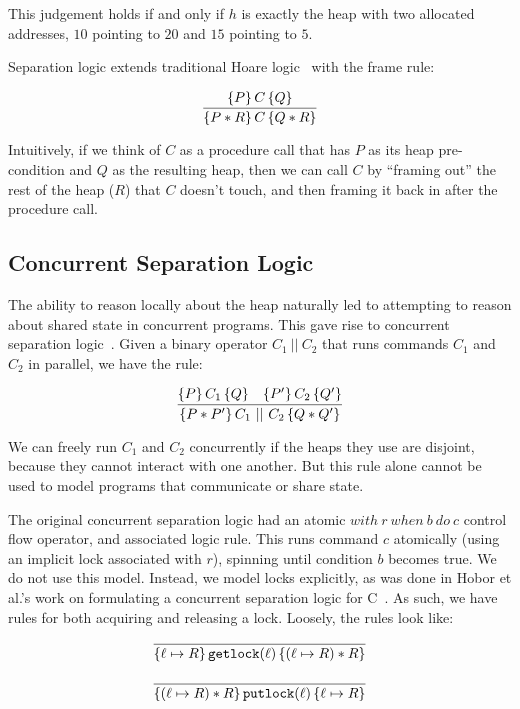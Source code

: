 This judgement holds if and only if $h$ is exactly the heap with two allocated
addresses, $10$ pointing to $20$ and $15$ pointing to $5$.

Separation logic extends traditional Hoare logic~\cite{hoare1969axiomatic} with
the frame rule:

\[
\infer{\hoaretrip{P * R}{C}{Q * R}}{\hoaretrip{P}{C}{Q}}
\]

Intuitively, if we think of $C$ as a procedure call that has $P$ as its heap
pre-condition and $Q$ as the resulting heap, then we can call $C$ by ``framing
out'' the rest of the heap ($R$) that $C$ doesn't touch, and then framing it
back in after the procedure call.

\subsection{Concurrent Separation Logic}

The ability to reason locally about the heap naturally led to attempting to
reason about shared state in concurrent programs.
This gave rise to concurrent
separation logic~\cite{o2007resources}.
Given a binary operator $C_1~||~C_2$ that
runs commands $C_1$ and $C_2$ in parallel, we have the rule:

\[
    \infer{\hoaretrip{P * P'}{C_1~||~C_2}{Q * Q'}}{\hoaretrip{P}{C_1}{Q} &
                                                     \hoaretrip{P'}{C_2}{Q'}}
\]

We can freely run $C_1$ and $C_2$ concurrently if the heaps they use are
disjoint, because they cannot interact with one another.
But this rule alone cannot be used to model
programs that communicate or share state.

The original concurrent separation logic had an atomic
$\mathit{with~} r \mathit{~when~} b \mathit{~do~} c$
control flow operator, and associated logic rule.
This runs command $c$
atomically (using an implicit lock associated with $r$),
spinning until condition $b$ becomes true.
We do not use this model.
Instead, we model locks explicitly, as was done in Hobor et al.'s work on
formulating a concurrent separation logic for C~\cite{hobor2008oracle}.
As such, we have rules for both acquiring and
releasing a lock.
Loosely, the rules look like:

\begin{align*}
    \infer{\hoaretrip{\ell \mapsto R}{\texttt{getlock}(\ell)}{(\ell \mapsto R) *
    R}}{} \\[+9px]
    \infer{\hoaretrip{(\ell \mapsto R) * R}{\texttt{putlock}(\ell)}{\ell \mapsto R}}{}
\end{align*}

